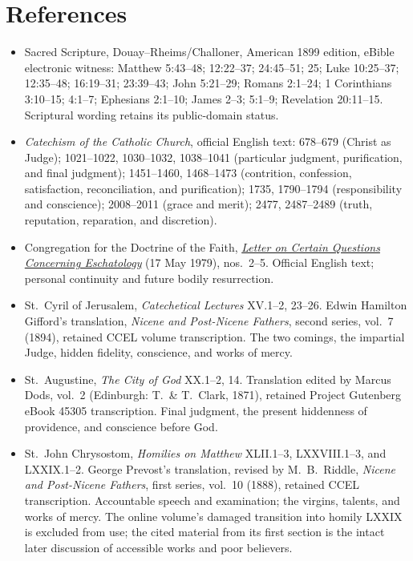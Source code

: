 \section{References}
\begingroup\small
\begin{itemize}[leftmargin=1.25em,itemsep=0.2em]
\item Sacred Scripture, Douay--Rheims/Challoner, American 1899 edition, eBible electronic witness: Matthew 5:43--48; 12:22--37; 24:45--51; 25; Luke 10:25--37; 12:35--48; 16:19--31; 23:39--43; John 5:21--29; Romans 2:1--24; 1 Corinthians 3:10--15; 4:1--7; Ephesians 2:1--10; James 2--3; 5:1--9; Revelation 20:11--15. Scriptural wording retains its public-domain status.
\item \emph{Catechism of the Catholic Church}, official English text: 678--679 (Christ as Judge); 1021--1022, 1030--1032, 1038--1041 (particular judgment, purification, and final judgment); 1451--1460, 1468--1473 (contrition, confession, satisfaction, reconciliation, and purification); 1735, 1790--1794 (responsibility and conscience); 2008--2011 (grace and merit); 2477, 2487--2489 (truth, reputation, reparation, and discretion).
\item Congregation for the Doctrine of the Faith, \href{https://www.vatican.va/roman_curia/congregations/cfaith/documents/rc_con_cfaith_doc_19790517_escatologia_en.html}{\emph{Letter on Certain Questions Concerning Eschatology}} (17 May 1979), nos.~2--5. Official English text; personal continuity and future bodily resurrection.
\item St.~Cyril of Jerusalem, \emph{Catechetical Lectures} XV.1--2, 23--26. Edwin Hamilton Gifford's translation, \emph{Nicene and Post-Nicene Fathers}, second series, vol.~7 (1894), retained CCEL volume transcription. The two comings, the impartial Judge, hidden fidelity, conscience, and works of mercy.
\item St.~Augustine, \emph{The City of God} XX.1--2, 14. Translation edited by Marcus Dods, vol.~2 (Edinburgh: T.~\& T.~Clark, 1871), retained Project Gutenberg eBook 45305 transcription. Final judgment, the present hiddenness of providence, and conscience before God.
\item St.~John Chrysostom, \emph{Homilies on Matthew} XLII.1--3, LXXVIII.1--3, and LXXIX.1--2. George Prevost's translation, revised by M.~B.~Riddle, \emph{Nicene and Post-Nicene Fathers}, first series, vol.~10 (1888), retained CCEL transcription. Accountable speech and examination; the virgins, talents, and works of mercy. The online volume's damaged transition into homily LXXIX is excluded from use; the cited material from its first section is the intact later discussion of accessible works and poor believers.

\end{itemize}
